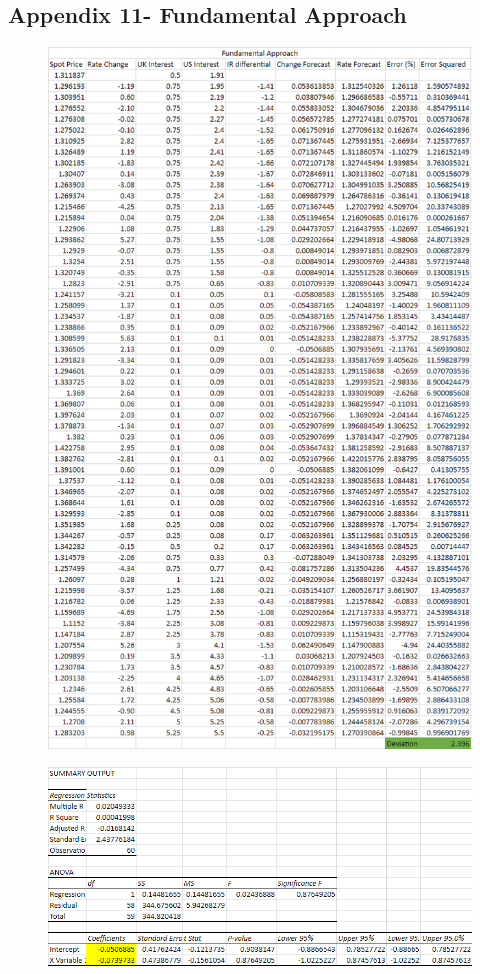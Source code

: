 \documentclass{article}
\let\Oldsubsection\subsection
\renewcommand{\subsection}{\FloatBarrier\Oldsubsection}
\begin{document}
\break

\subsection*{Appendix 11- Fundamental Approach}


\begin{figure}[h!]
    \centering
    \includegraphics[scale=0.5]{graphs/app11.png}
\end{figure}


\begin{figure}[h!]
    \centering
    \includegraphics[scale=0.5]{graphs/app11(1).png}
\end{figure}
\end{document}
